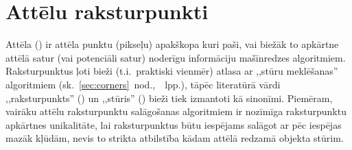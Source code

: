 \section{Attēlu raksturpunkti} \label{sec:algo}
Attēla  () ir attēla punktu (pikseļu)
apakškopa kuri paši, vai biežāk to apkārtne attēlā 
satur (vai potenciāli satur) noderīgu informāciju mašīnredzes algoritmiem.
Raksturpunktus ļoti bieži (t.i.~praktiski vienmēr)
atlasa ar ,,stūru meklēšanas'' algoritmiem
(sk.~\ref{sec:corners}~nod.,~\pageref{sec:corners}~lpp.),
tāpēc literatūrā vārdi ,,raksturpunkts'' () un ,,stūris''
() bieži tiek izmantoti kā sinonīmi. Piemēram, vairāku attēlu
raksturpunktu salāgošanas algoritmiem ir 
nozīmīga raksturpunktu apkārtnes unikalitāte,
lai raksturpunktus būtu iespējams salāgot ar pēc iespējas mazāk kļūdām,
nevis to strikta atbilstība kādam attēlā redzamā objekta stūrim.




